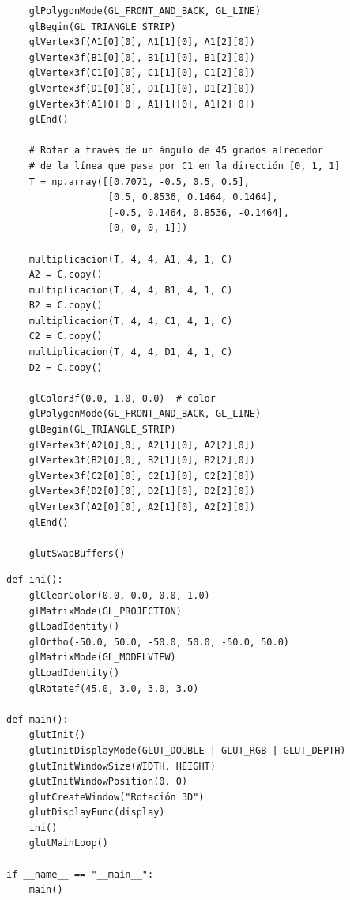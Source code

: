 \documentclass[a4paper]{article}
\begin{document}
\newpage
\begin{center}
\begin{mycodeboxl}
\begin{lstlisting}
    glPolygonMode(GL_FRONT_AND_BACK, GL_LINE)
    glBegin(GL_TRIANGLE_STRIP)
    glVertex3f(A1[0][0], A1[1][0], A1[2][0])
    glVertex3f(B1[0][0], B1[1][0], B1[2][0])
    glVertex3f(C1[0][0], C1[1][0], C1[2][0])
    glVertex3f(D1[0][0], D1[1][0], D1[2][0])
    glVertex3f(A1[0][0], A1[1][0], A1[2][0])
    glEnd()

    # Rotar a través de un ángulo de 45 grados alrededor
    # de la línea que pasa por C1 en la dirección [0, 1, 1]
    T = np.array([[0.7071, -0.5, 0.5, 0.5],
                  [0.5, 0.8536, 0.1464, 0.1464],
                  [-0.5, 0.1464, 0.8536, -0.1464],
                  [0, 0, 0, 1]])

    multiplicacion(T, 4, 4, A1, 4, 1, C)
    A2 = C.copy()
    multiplicacion(T, 4, 4, B1, 4, 1, C)
    B2 = C.copy()
    multiplicacion(T, 4, 4, C1, 4, 1, C)
    C2 = C.copy()
    multiplicacion(T, 4, 4, D1, 4, 1, C)
    D2 = C.copy()

    glColor3f(0.0, 1.0, 0.0)  # color 
    glPolygonMode(GL_FRONT_AND_BACK, GL_LINE)
    glBegin(GL_TRIANGLE_STRIP)
    glVertex3f(A2[0][0], A2[1][0], A2[2][0])
    glVertex3f(B2[0][0], B2[1][0], B2[2][0])
    glVertex3f(C2[0][0], C2[1][0], C2[2][0])
    glVertex3f(D2[0][0], D2[1][0], D2[2][0])
    glVertex3f(A2[0][0], A2[1][0], A2[2][0])
    glEnd()

    glutSwapBuffers()
\end{lstlisting}
\end{mycodeboxl}
\end{center}

\begin{center}
\begin{mycodeboxl}
\begin{lstlisting}
def ini():
    glClearColor(0.0, 0.0, 0.0, 1.0)
    glMatrixMode(GL_PROJECTION)
    glLoadIdentity()
    glOrtho(-50.0, 50.0, -50.0, 50.0, -50.0, 50.0)
    glMatrixMode(GL_MODELVIEW)
    glLoadIdentity()
    glRotatef(45.0, 3.0, 3.0, 3.0)

def main():
    glutInit()
    glutInitDisplayMode(GLUT_DOUBLE | GLUT_RGB | GLUT_DEPTH)
    glutInitWindowSize(WIDTH, HEIGHT)
    glutInitWindowPosition(0, 0)
    glutCreateWindow("Rotación 3D")
    glutDisplayFunc(display)
    ini()
    glutMainLoop()

if __name__ == "__main__":
    main()
\end{lstlisting}
\end{mycodeboxl}
\end{center}
\end{document}
